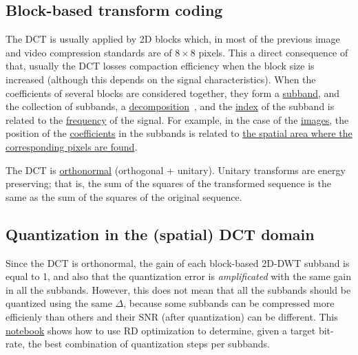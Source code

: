 \subsection{Block-based transform coding}

The DCT is usually applied by 2D blocks which, in most of the previous
image and video compression standards are of $8\times 8$ pixels. This a direct
consequence of that, usually the DCT losses compaction efficiency when
the block size is increased (although this depends on the signal
characteristics). When the coefficients of several blocks are
considered together, they form a
\href{https://en.wikipedia.org/wiki/Sub-band_coding}{subband}, and the
collection of subbands, a
\href{https://en.wikipedia.org/wiki/Discrete_wavelet_transform}{decomposition}~\cite{vetterli2014foundations},
and the
\href{https://en.wikipedia.org/wiki/Array_data_structure#Element_identifier_and_addressing_formulas}{index}
of the subband is related to the
\href{https://en.wikipedia.org/wiki/Frequency}{frequency} of the
signal. For example, in the case of the
\href{https://en.wikipedia.org/wiki/Digital_image}{images}, the
position of the
\href{https://en.wikipedia.org/wiki/Coefficient}{coefficients} in the
subbands is related to
\href{https://github.com/Sistemas-Multimedia/Sistemas-Multimedia.github.io/blob/master/milestones/07-DCT/block_DCT_compression.ipynb}{the
  spatial area where the corresponding pixels are found}.

The DCT is
\href{https://en.wikipedia.org/wiki/Orthonormality}{orthonormal}
(orthogonal + unitary). Unitary transforms are energy preserving;
that is, the sum of the squares of the transformed sequence is the
same as the sum of the squares of the original sequence.

\subsection{Quantization in the (spatial) DCT domain}

Since the DCT is orthonormal, the gain of each block-based 2D-DWT
subband is equal to 1, and also that the quantization error is
\emph{amplificated} with the same gain in all the subbands. However,
this does not mean that all the subbands should be quantized using the
same $\Delta$, because some subbands can be compressed more efficienly
than others and their SNR (after quantization) can be different. This
\href{https://github.com/Sistemas-Multimedia/Sistemas-Multimedia.github.io/blob/master/milestones/07-DCT/block_DCT_compression.ipynb}{notebook}
shows how to use RD optimization to determine, given a target
bit-rate, the best combination of quantization steps per subbands.

